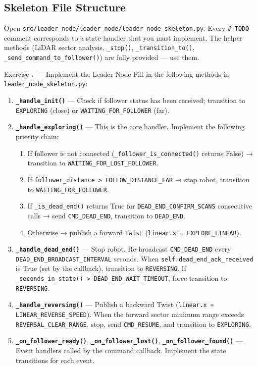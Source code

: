 \documentclass[11pt, a4paper]{article}
\newcounter{exercise}[section]
\renewcommand{\theexercise}{\thesection.\arabic{exercise}}
\newenvironment{Ex}[1]
  {\refstepcounter{exercise}\begin{taskbox}{Exercise \theexercise\ --- #1}}
  {\end{taskbox}}
\begin{document}
\subsection{Skeleton File Structure}

Open \texttt{src/leader\_node/leader\_node/leader\_node\_skeleton.py}.
Every \texttt{\# TODO} comment corresponds to a state handler that you must implement.
The helper methods (LiDAR sector analysis, \texttt{\_stop()}, \texttt{\_transition\_to()},
\texttt{\_send\_command\_to\_follower()}) are fully provided — use them.

\begin{Ex}{Implement the Leader Node}
Fill in the following methods in \texttt{leader\_node\_skeleton.py}:
\begin{enumerate}
  \item \textbf{\texttt{\_handle\_init()}} — Check if follower status has been received;
        transition to \texttt{EXPLORING} (close) or \texttt{WAITING\_FOR\_FOLLOWER} (far).
  \item \textbf{\texttt{\_handle\_exploring()}} — This is the core handler.
        Implement the following priority chain:
        \begin{enumerate}[label=\roman*.]
          \item If follower is not connected (\texttt{\_follower\_is\_connected()} returns False)
                → transition to \texttt{WAITING\_FOR\_LOST\_FOLLOWER}.
          \item If \texttt{follower\_distance > FOLLOW\_DISTANCE\_FAR}
                → stop robot, transition to \texttt{WAITING\_FOR\_FOLLOWER}.
          \item If \texttt{\_is\_dead\_end()} returns True for
                \texttt{DEAD\_END\_CONFIRM\_SCANS} consecutive calls
                → send \texttt{CMD\_DEAD\_END}, transition to \texttt{DEAD\_END}.
          \item Otherwise → publish a forward \texttt{Twist}
                (\texttt{linear.x = EXPLORE\_LINEAR}).
        \end{enumerate}
  \item \textbf{\texttt{\_handle\_dead\_end()}} — Stop robot.
        Re-broadcast \texttt{CMD\_DEAD\_END} every \texttt{DEAD\_END\_BROADCAST\_INTERVAL}
        seconds. When \texttt{self.dead\_end\_ack\_received} is True (set by the callback),
        transition to \texttt{REVERSING}.
        If \texttt{\_seconds\_in\_state() > DEAD\_END\_WAIT\_TIMEOUT},
        force transition to \texttt{REVERSING}.
  \item \textbf{\texttt{\_handle\_reversing()}} — Publish a backward Twist
        (\texttt{linear.x = LINEAR\_REVERSE\_SPEED}).
        When the forward sector minimum range exceeds
        \texttt{REVERSAL\_CLEAR\_RANGE}, stop, send \texttt{CMD\_RESUME},
        and transition to \texttt{EXPLORING}.
  \item \textbf{\texttt{\_on\_follower\_ready()}},
        \textbf{\texttt{\_on\_follower\_lost()}},
        \textbf{\texttt{\_on\_follower\_found()}} — Event handlers called by the
        command callback. Implement the state transitions for each event.
\end{enumerate}
\end{Ex}
\end{document}
